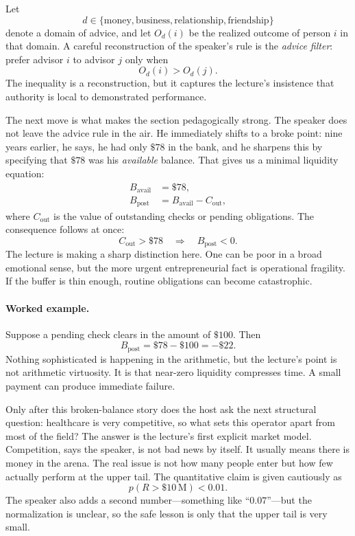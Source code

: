 \begin{definition}
Let
\[
d \in \{\text{money},\text{business},\text{relationship},\text{friendship}\}
\]
denote a domain of advice, and let \(O_d(i)\) be the realized outcome of person \(i\) in that domain. A careful reconstruction of the speaker's rule is the \emph{advice filter}: prefer advisor \(i\) to advisor \(j\) only when
\begin{equation}
O_d(i) > O_d(j).
\end{equation}
The inequality is a reconstruction, but it captures the lecture's insistence that authority is local to demonstrated performance.
\end{definition}

The next move is what makes the section pedagogically strong. The speaker does not leave the advice rule in the air. He immediately shifts to a broke point: nine years earlier, he says, he had only \(\$78\) in the bank, and he sharpens this by specifying that \(\$78\) was his \emph{available} balance. That gives us a minimal liquidity equation:
\begin{align}
B_{\text{avail}} &= \text{\$}78,\\
B_{\text{post}} &= B_{\text{avail}} - C_{\text{out}},
\end{align}
where \(C_{\text{out}}\) is the value of outstanding checks or pending obligations. The consequence follows at once:
\begin{equation}
C_{\text{out}} > \text{\$}78
\quad \Rightarrow \quad
B_{\text{post}} < 0.
\end{equation}
The lecture is making a sharp distinction here. One can be poor in a broad emotional sense, but the more urgent entrepreneurial fact is operational fragility. If the buffer is thin enough, routine obligations can become catastrophic.

\paragraph{Worked example.}
Suppose a pending check clears in the amount of \(\$100\). Then
\begin{equation}
B_{\text{post}} = \text{\$}78 - \text{\$}100 = -\text{\$}22.
\end{equation}
Nothing sophisticated is happening in the arithmetic, but the lecture's point is not arithmetic virtuosity. It is that near-zero liquidity compresses time. A small payment can produce immediate failure.

Only after this broken-balance story does the host ask the next structural question: healthcare is very competitive, so what sets this operator apart from most of the field? The answer is the lecture's first explicit market model. Competition, says the speaker, is not bad news by itself. It usually means there is money in the arena. The real issue is not how many people enter but how few actually perform at the upper tail. The quantitative claim is given cautiously as
\begin{equation}
p(R > \text{\$}10\,\mathrm{M}) < 0.01.
\end{equation}
The speaker also adds a second number---something like ``\(0.07\)''---but the normalization is unclear, so the safe lesson is only that the upper tail is very small.

